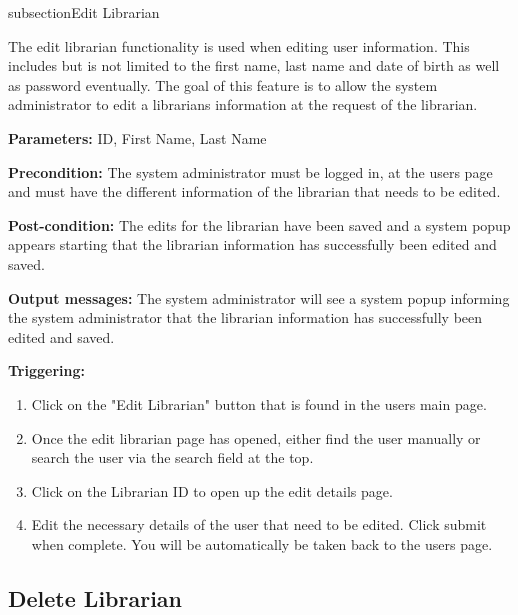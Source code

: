 subsection{Edit Librarian}

The edit librarian functionality is used when editing user information. This includes but is not limited to the first name, last name and date of birth as well as password eventually. The goal of this feature is to allow the system administrator to edit a librarians information at the request of the librarian. 

\begin{description}

\item \textbf{Parameters:} ID, First Name, Last Name

\item \textbf{Precondition:} The system administrator must be logged in, at the users page and must have the different information of the librarian that needs to be edited.

\item \textbf{Post-condition:} The edits for the librarian have been saved and a system popup appears starting that the librarian information has successfully been edited and saved. 

\item \textbf{Output messages:} The system administrator will see a system popup informing the system administrator that the librarian information has successfully been edited and saved.

\item \textbf{Triggering:}
\begin{enumerate}

\item Click on the "Edit Librarian" button that is found in the users main page.

\item Once the edit librarian page has opened, either find the user manually or search the user via the search field at the top.

\item Click on the Librarian ID to open up the edit details page. 

\item Edit the necessary details of the user that need to be edited. Click submit when complete. You will be automatically be taken back to the users page.

\end{enumerate}

\end{description}

\subsection{Delete Librarian}

